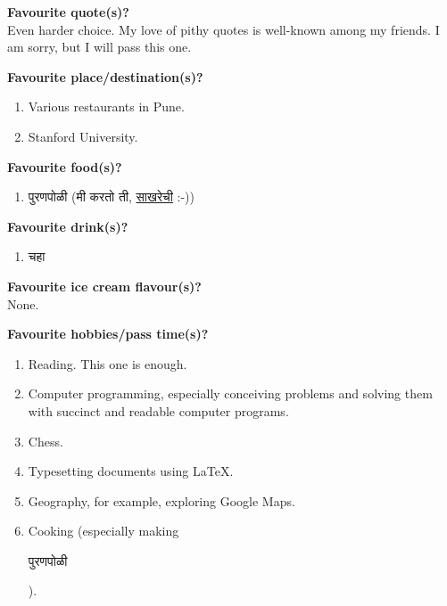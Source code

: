 \documentclass[17pt]{extarticle}  %
\begin{document}
\begin{enumerate}
\begin{english}
\item \textbf{Favourite quote(s)?}\\
Even harder choice. My love of pithy quotes is well-known among my friends. I am sorry, but I will pass this one.

\item \textbf{Favourite place/destination(s)?}\\

\begin{enumerate}
\item Various restaurants in Pune.
\item Stanford University.
\end{enumerate}

\item\textbf{Favourite food(s)?}\\
\begin{enumerate}
\item \begin{marathi}पुरणपोळी (मी करतो ती, \href{https://github.com/kedarmhaswade/writings/blob/main/marathi/puraNa-poLii/saakharechii-puraNapoLii.pdf}{साखरेची} :-))\end{marathi}
\end{enumerate}

\item\textbf{Favourite drink(s)?}\\
\begin{enumerate}
\item \begin{marathi}चहा\end{marathi}
\end{enumerate}

\item\textbf{Favourite ice cream flavour(s)?}\\
None.

\item\textbf{Favourite hobbies/pass time(s)?}\\
\begin{enumerate}
\item Reading. This one is enough.
\item Computer programming, especially conceiving problems and solving them with succinct and readable computer programs.
\item Chess.
\item Typesetting documents using \LaTeX.
\item Geography, for example, exploring Google Maps.
\item Cooking (especially making \begin{marathi}पुरणपोळी\end{marathi}).
\end{enumerate}


\end{english}
\end{enumerate}
\end{document}
